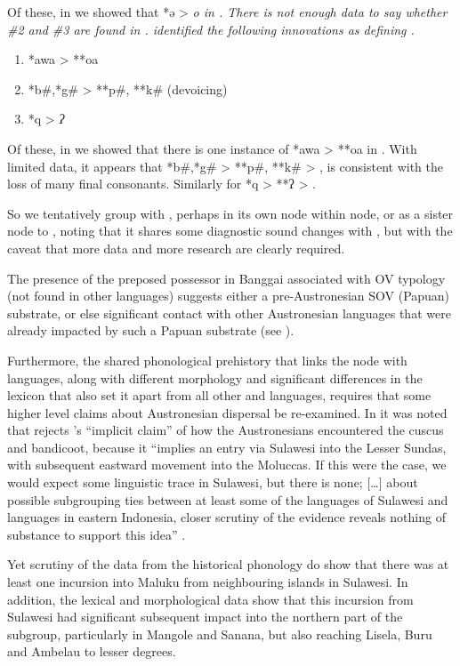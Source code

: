Of these, in  we showed that *ə > \it{o} in .
There is not enough data to say whether {\#}2
and {\#}3 are found in .
\citet{Mead2003b} identified the following innovations as defining
.

\begin{enumerate}[noitemsep]
	\item	*awa > **oa
	\item	*b{\#},*g{\#} > **p{\#}, **k{\#} (devoicing)
	\item	*q > \it{ʔ} 
\end{enumerate}

Of these, in  we showed that there is one instance
of *awa > **oa in .
With limited data, it appears that *b{\#},*g{\#} > **p{\#},
**k{\#} > {\0}, is consistent with the loss of many final consonants.
Similarly for *q > **ʔ > {\0}.

So we tentatively group  with ,
perhaps in its own node within  node,
or as a sister node to ,
noting that it shares some diagnostic sound changes with ,
but with the caveat that more data
and more research are clearly required.

The presence of the preposed possessor in Banggai associated
with OV typology (not found in other  languages)
suggests either a pre-Austronesian SOV (Papuan) substrate,
or else significant contact with other Austronesian languages
that were already impacted by such a Papuan substrate (see ).

Furthermore, the shared phonological prehistory that links the
 node with  languages,
along with different morphology
and significant differences in the lexicon that also set it apart
from all other 
and  languages, requires that some higher level
claims about Austronesian dispersal be re-examined.
In  it was noted that \citet{Blust2012b} rejects \citeauthor{Schapper2011}’s
\citeyear{Schapper2011} “implicit claim” \citep[273]{Blust2012b} of how the Austronesians
encountered the cuscus and bandicoot, because it
“implies an entry via Sulawesi into
the Lesser Sundas, with subsequent eastward movement into the Moluccas.
If this were the case,
we would expect some linguistic trace in Sulawesi,
but there is none; [{\ldots}] about possible subgrouping ties
between at least some of the languages of Sulawesi
and languages in eastern Indonesia,
closer scrutiny of the evidence reveals nothing of substance
to support this idea” \citep[274]{Blust2012b}.

Yet scrutiny of the  data from the historical phonology
do show that there was at least one incursion into Maluku from
neighbouring islands in Sulawesi.
In addition, the lexical
and morphological data show that this incursion from Sulawesi
had significant subsequent impact into the northern part of the
 subgroup, particularly in Mangole and Sanana, but also reaching Lisela,
Buru and Ambelau to lesser degrees.

